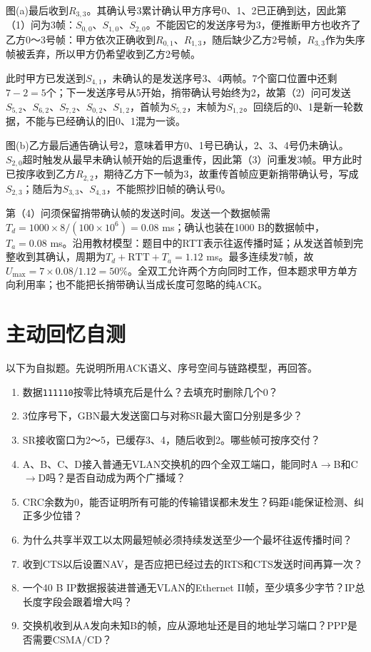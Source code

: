 图(a)最后收到\(R_{3,3}\)。其确认号3累计确认甲方序号0、1、2已正确到达，因此第（1）问为3帧：\(S_{0,0}\)、\(S_{1,0}\)、\(S_{2,0}\)。不能因它的发送序号为3，便推断甲方也收齐了乙方0～3号帧：甲方依次正确收到\(R_{0,1}\)、\(R_{1,3}\)，随后缺少乙方2号帧，\(R_{3,3}\)作为失序帧被丢弃，所以甲方仍希望收到乙方2号帧。

此时甲方已发送到\(S_{4,1}\)，未确认的是发送序号3、4两帧。7个窗口位置中还剩\(7-2=5\)个；下一发送序号从5开始，捎带确认号始终为2，故第（2）问可发送\(S_{5,2}\)、\(S_{6,2}\)、\(S_{7,2}\)、\(S_{0,2}\)、\(S_{1,2}\)，首帧为\(S_{5,2}\)，末帧为\(S_{1,2}\)。回绕后的0、1是新一轮数据，不能与已经确认的旧0、1混为一谈。

图(b)乙方最后通告确认号2，意味着甲方0、1号已确认，2、3、4号仍未确认。\(S_{2,0}\)超时触发从最早未确认帧开始的后退重传，因此第（3）问重发3帧。甲方此时已按序收到乙方\(R_{2,2}\)，期待乙方下一帧为3，故重传首帧应更新捎带确认号，写成\(S_{2,3}\)；随后为\(S_{3,3}\)、\(S_{4,3}\)，不能照抄旧帧的确认号0。

第（4）问须保留捎带确认帧的发送时间。发送一个数据帧需\(T_d=1000\times8/(100\times10^6)=0.08\) ms；确认也装在1000 B的数据帧中，\(T_a=0.08\) ms。沿用教材模型：题目中的RTT表示往返传播时延；从发送首帧到完整收到其确认，周期为\(T_d+\mathrm{RTT}+T_a=1.12\) ms。最多连续发7帧，故\(U_{\max}=7\times0.08/1.12=50\%\)。全双工允许两个方向同时工作，但本题求甲方单方向利用率；也不能把长捎带确认当成长度可忽略的纯ACK。

\section{主动回忆自测}\label{CN03-review}

以下为自拟题。先说明所用ACK语义、序号空间与链路模型，再回答。

\begin{enumerate}
\def\labelenumi{\arabic{enumi}.}
\tightlist
\item
  数据\texttt{111110}按零比特填充后是什么？去填充时删除几个0？
\item
  3位序号下，GBN最大发送窗口与对称SR最大窗口分别是多少？
\item
  SR接收窗口为2～5，已缓存3、4，随后收到2。哪些帧可按序交付？
\item
  A、B、C、D接入普通无VLAN交换机的四个全双工端口，能同时A\ensuremath{\to}B和C\ensuremath{\to}D吗？是否自动成为两个广播域？
\item
  CRC余数为0，能否证明所有可能的传输错误都未发生？码距4能保证检测、纠正多少位错？
\item
  为什么共享半双工以太网最短帧必须持续发送至少一个最坏往返传播时间？
\item
  收到CTS以后设置NAV，是否应把已经过去的RTS和CTS发送时间再算一次？
\item
  一个40 B IP数据报装进普通无VLAN的Ethernet II帧，至少填多少字节？IP总长度字段会跟着增大吗？
\item
  交换机收到从A发向未知B的帧，应从源地址还是目的地址学习端口？PPP是否需要CSMA/CD？
\end{enumerate}

